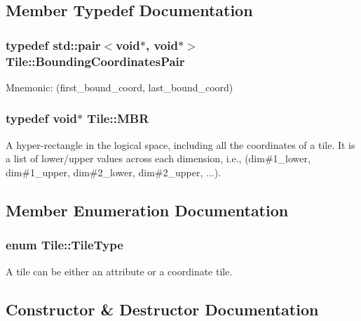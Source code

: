 \subsection{Member Typedef Documentation}
\hypertarget{classTile_a7103069b7ba05d1032733e3a026b8632}{}
\subsubsection[{Bounding\+Coordinates\+Pair}]{\setlength{\rightskip}{0pt plus 5cm}typedef std\+::pair$<$void$\ast$, void$\ast$$>$ {\bf Tile\+::\+Bounding\+Coordinates\+Pair}}\label{classTile_a7103069b7ba05d1032733e3a026b8632}
Mnemonic\+: (first\+\_\+bound\+\_\+coord, last\+\_\+bound\+\_\+coord) \hypertarget{classTile_a0b0f911c937d339ce110c18a2d015a4d}{}
\subsubsection[{M\+B\+R}]{\setlength{\rightskip}{0pt plus 5cm}typedef void$\ast$ {\bf Tile\+::\+M\+B\+R}}\label{classTile_a0b0f911c937d339ce110c18a2d015a4d}
A hyper-\/rectangle in the logical space, including all the coordinates of a tile. It is a list of lower/upper values across each dimension, i.\+e., (dim\#1\+\_\+lower, dim\#1\+\_\+upper, dim\#2\+\_\+lower, dim\#2\+\_\+upper, ...). 

\subsection{Member Enumeration Documentation}
\hypertarget{classTile_a4d24e5edfa7092e2fd2d0f772e3e1433}{}
\subsubsection[{Tile\+Type}]{\setlength{\rightskip}{0pt plus 5cm}enum {\bf Tile\+::\+Tile\+Type}}\label{classTile_a4d24e5edfa7092e2fd2d0f772e3e1433}
A tile can be either an attribute or a coordinate tile. 

\subsection{Constructor \& Destructor Documentation}
\hypertarget{classTile_a1850e98175b9d67521cd0aad8dedafec}{}
